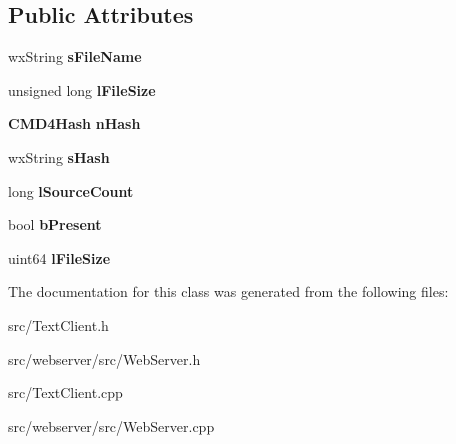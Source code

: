 \subsection*{Public Attributes}
\begin{DoxyCompactItemize}
\item 
wxString {\bfseries sFileName}\label{classSearchFile_ae99ef842dd3ad9e5eb68250d17ed5806}

\item 
unsigned long {\bfseries lFileSize}\label{classSearchFile_a7f06d56104456b9ab86af23e5e37a2f2}

\item 
{\bf CMD4Hash} {\bfseries nHash}\label{classSearchFile_ad48bfe28e99596593aa015d1cfef4a6a}

\item 
wxString {\bfseries sHash}\label{classSearchFile_aeae419c18564e2814ba800710fb57d9c}

\item 
long {\bfseries lSourceCount}\label{classSearchFile_a769a48b3c28554cdbfacdeefa25fb572}

\item 
bool {\bfseries bPresent}\label{classSearchFile_a4ecf0a844c4c1edbc8e86f77e10c2d30}

\item 
uint64 {\bfseries lFileSize}\label{classSearchFile_a4338e602444db8ab9d9442ce77b5337e}

\end{DoxyCompactItemize}


The documentation for this class was generated from the following files:\begin{DoxyCompactItemize}
\item 
src/TextClient.h\item 
src/webserver/src/WebServer.h\item 
src/TextClient.cpp\item 
src/webserver/src/WebServer.cpp\end{DoxyCompactItemize}
